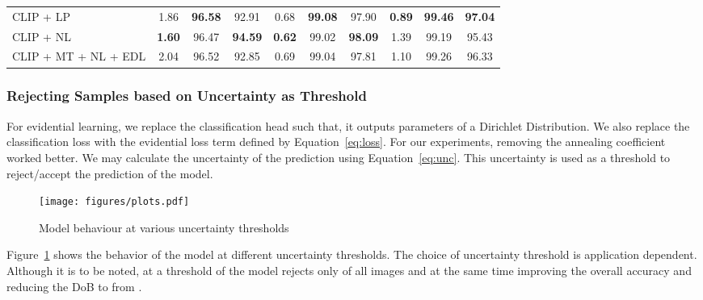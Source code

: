 \documentclass[runningheads]{llncs}
\begin{document}
\begin{table}
{\begin{tabular}{lccccccccc}
CLIP + LP            & 1.86                      & \textbf{96.58}               & 92.91                   & 0.68                      & \textbf{99.08}                        & 97.90                   & \textbf{0.89}                      & \textbf{99.46}                        & \textbf{97.04}                    \\
CLIP + NL            & \textbf{1.60}             & 96.47                        & \textbf{94.59}          & \textbf{0.62}                      & 99.02                        & \textbf{98.09}                   & 1.39                      & 99.19                        & 95.43                    \\
CLIP + MT + NL + EDL & 2.04                      & 96.52                        & 92.85                   & 0.69                      & 99.04                        & 97.81                   & 1.10                      & 99.26                        & 96.33                    \\
\bottomrule
\end{tabular}
}
\end{table}

\subsubsection{\textbf{Rejecting Samples based on Uncertainty as Threshold}} For evidential learning, we replace the classification head such that, it outputs parameters of a Dirichlet Distribution. We also replace the classification loss  with the evidential loss term defined by Equation~\ref{eq:loss}. For our experiments, removing the annealing coefficient  worked better. We may calculate the uncertainty of the prediction using Equation~\ref{eq:unc}. This uncertainty is used as a threshold to reject/accept the prediction of the model.
\begin{figure}[!ht]
    \centering
    \texttt{[image: figures/plots.pdf]}
    \caption{Model behaviour at various uncertainty thresholds}
    \label{fig:reject_option}
\end{figure}

Figure~\ref{fig:reject_option} shows the behavior of the model at different uncertainty thresholds. The choice of uncertainty threshold is application dependent. Although it is to be noted, at a threshold of  the model rejects only  of all images and at the same time improving the overall accuracy  and reducing the DoB to  from .
\end{document}

